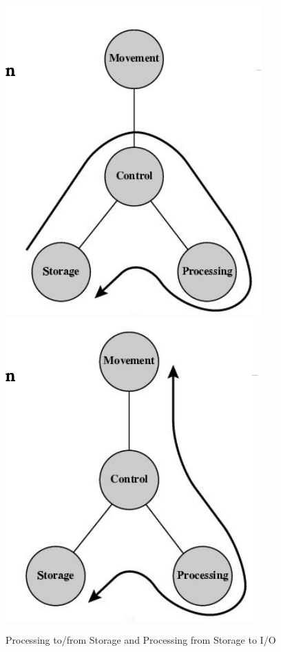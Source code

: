 \documentclass[9pt,twocolumn]{article}
\begin{document}
    \begin{figure}[h]
      \centering
      \includegraphics[scale=0.4]{./assets/001/processing-to-storage.png}
      \includegraphics[scale=0.4]{./assets/001/processing-from-io.png}
      \caption{Processing to/from Storage and Processing from Storage to I/O}
    \end{figure}
\end{document}
